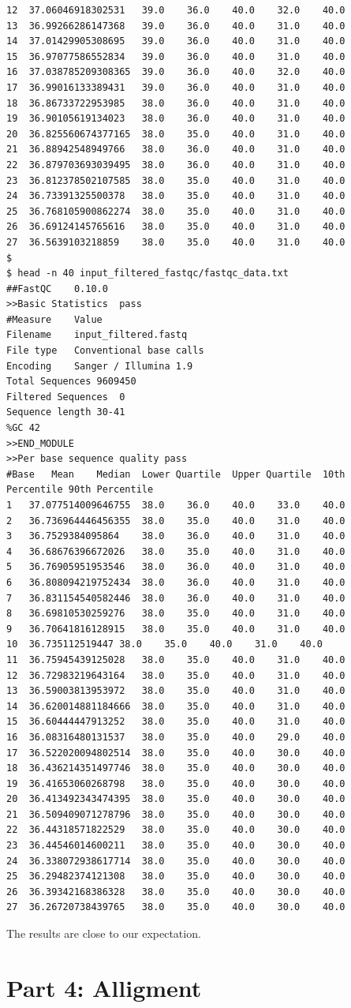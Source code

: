 \documentclass[11pt]{article} %
\begin{document}
\begin{lstlisting}
12	37.06046918302531	39.0	36.0	40.0	32.0	40.0
13	36.99266286147368	39.0	36.0	40.0	31.0	40.0
14	37.01429905308695	39.0	36.0	40.0	31.0	40.0
15	36.97077586552834	39.0	36.0	40.0	31.0	40.0
16	37.038785209308365	39.0	36.0	40.0	32.0	40.0
17	36.99016133389431	39.0	36.0	40.0	31.0	40.0
18	36.86733722953985	38.0	36.0	40.0	31.0	40.0
19	36.90105619134023	38.0	36.0	40.0	31.0	40.0
20	36.825560674377165	38.0	35.0	40.0	31.0	40.0
21	36.88942548949766	38.0	36.0	40.0	31.0	40.0
22	36.879703693039495	38.0	36.0	40.0	31.0	40.0
23	36.812378502107585	38.0	35.0	40.0	31.0	40.0
24	36.73391325500378	38.0	35.0	40.0	31.0	40.0
25	36.768105900862274	38.0	35.0	40.0	31.0	40.0
26	36.69124145765616	38.0	35.0	40.0	31.0	40.0
27	36.5639103218859	38.0	35.0	40.0	31.0	40.0
$
$ head -n 40 input_filtered_fastqc/fastqc_data.txt 
##FastQC	0.10.0
>>Basic Statistics	pass
#Measure	Value	
Filename	input_filtered.fastq	
File type	Conventional base calls	
Encoding	Sanger / Illumina 1.9	
Total Sequences	9609450	
Filtered Sequences	0	
Sequence length	30-41	
%GC	42	
>>END_MODULE
>>Per base sequence quality	pass
#Base	Mean	Median	Lower Quartile	Upper Quartile	10th Percentile	90th Percentile
1	37.077514009646755	38.0	36.0	40.0	33.0	40.0
2	36.736964446456355	38.0	35.0	40.0	31.0	40.0
3	36.7529384095864	38.0	36.0	40.0	31.0	40.0
4	36.68676396672026	38.0	35.0	40.0	31.0	40.0
5	36.76905951953546	38.0	36.0	40.0	31.0	40.0
6	36.808094219752434	38.0	36.0	40.0	31.0	40.0
7	36.831154540582446	38.0	36.0	40.0	31.0	40.0
8	36.69810530259276	38.0	35.0	40.0	31.0	40.0
9	36.70641816128915	38.0	35.0	40.0	31.0	40.0
10	36.735112519447	38.0	35.0	40.0	31.0	40.0
11	36.75945439125028	38.0	35.0	40.0	31.0	40.0
12	36.72983219643164	38.0	35.0	40.0	31.0	40.0
13	36.59003813953972	38.0	35.0	40.0	31.0	40.0
14	36.620014881184666	38.0	35.0	40.0	31.0	40.0
15	36.60444447913252	38.0	35.0	40.0	31.0	40.0
16	36.08316480131537	38.0	35.0	40.0	29.0	40.0
17	36.522020094802514	38.0	35.0	40.0	30.0	40.0
18	36.436214351497746	38.0	35.0	40.0	30.0	40.0
19	36.41653060268798	38.0	35.0	40.0	30.0	40.0
20	36.413492343474395	38.0	35.0	40.0	30.0	40.0
21	36.509409071278796	38.0	35.0	40.0	30.0	40.0
22	36.44318571822529	38.0	35.0	40.0	30.0	40.0
23	36.44546014600211	38.0	35.0	40.0	30.0	40.0
24	36.338072938617714	38.0	35.0	40.0	30.0	40.0
25	36.29482374121308	38.0	35.0	40.0	30.0	40.0
26	36.39342168386328	38.0	35.0	40.0	30.0	40.0
27	36.26720738439765	38.0	35.0	40.0	30.0	40.0
\end{lstlisting}

The results are close to our expectation.

\section{Part 4: Alligment}
\end{document}
